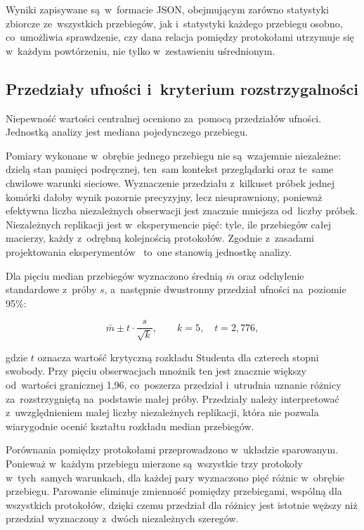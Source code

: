 Wyniki zapisywane są~w~formacie JSON, obejmującym zarówno statystyki zbiorcze ze~wszystkich przebiegów, jak i~statystyki każdego przebiegu osobno, co~umożliwia sprawdzenie, czy dana relacja pomiędzy protokołami utrzymuje się w~każdym powtórzeniu, nie tylko w~zestawieniu uśrednionym.

\subsection{Przedziały ufności i~kryterium rozstrzygalności}
\label{subsec:MetodykaPrzedzialow}

Niepewność wartości centralnej oceniono za~pomocą przedziałów ufności. Jednostką analizy jest mediana pojedynczego przebiegu.

Pomiary wykonane w~obrębie
jednego przebiegu nie są~wzajemnie niezależne: dzielą stan pamięci
podręcznej, ten~sam kontekst przeglądarki oraz te~same chwilowe warunki
sieciowe. Wyznaczenie przedziału z~kilkuset próbek jednej komórki
dałoby wynik pozornie precyzyjny, lecz nieuprawniony, ponieważ
efektywna liczba niezależnych obserwacji jest znacznie mniejsza od~liczby
próbek. Niezależnych replikacji jest w~eksperymencie pięć: tyle, ile
przebiegów całej macierzy, każdy z~odrębną kolejnością protokołów.
Zgodnie z~zasadami projektowania eksperymentów~\cite{bib:Jain1991}
to~one stanowią jednostkę analizy.

Dla pięciu median przebiegów wyznaczono średnią $\bar{m}$ oraz odchylenie standardowe z~próby $s$, a~następnie dwustronny przedział ufności na~poziomie 95\%:

\begin{equation}
\bar{m} \pm t \cdot \frac{s}{\sqrt{k}}, \qquad k = 5, \quad t = 2{,}776,
\label{eq:PrzedzialUfnosci}
\end{equation}

gdzie $t$ oznacza wartość krytyczną rozkładu Studenta dla czterech stopni swobody. Przy pięciu obserwacjach mnożnik ten jest znacznie większy od~wartości granicznej 1,96, co~poszerza przedział i~utrudnia uznanie różnicy za~rozstrzygniętą na~podstawie małej próby. Przedziały należy interpretować z~uwzględnieniem małej liczby niezależnych replikacji, która nie pozwala wiarygodnie ocenić kształtu rozkładu median przebiegów.

Porównania pomiędzy protokołami przeprowadzono w~układzie sparowanym. Ponieważ w~każdym przebiegu mierzone są~wszystkie trzy protokoły w~tych~samych warunkach, dla każdej pary wyznaczono pięć różnic w~obrębie przebiegu. Parowanie eliminuje zmienność pomiędzy przebiegami, wspólną dla wszystkich protokołów, dzięki czemu przedział dla różnicy jest istotnie węższy niż przedział wyznaczony z~dwóch niezależnych szeregów.

